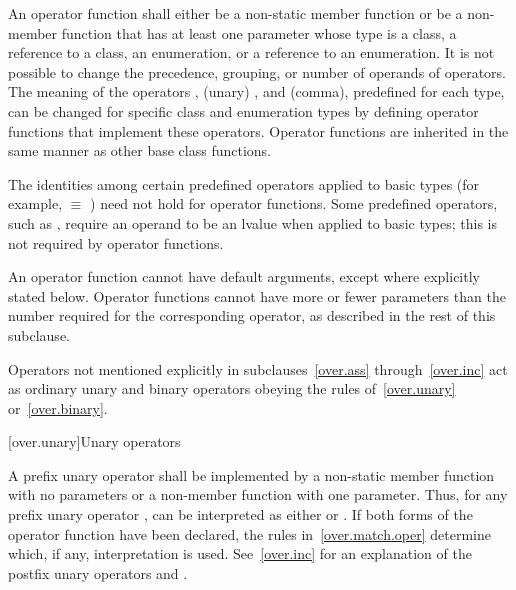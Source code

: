 \pnum
{}%
An operator function
shall either be a non-static member function or be a non-member function that
has at least one parameter whose type is a class, a reference to a class, an
enumeration, or a reference to an enumeration.
It is not possible to change the precedence, grouping, or number of operands
of operators.
The meaning of the operators
\tcode{=},
(unary)
\tcode{\&},
and
\tcode{,}
(comma), predefined for each type, can be changed for specific
class and enumeration types by
defining operator functions that implement these operators.
%
Operator functions are inherited in the same manner as other base class
functions.

\pnum
{}%
The identities among certain predefined operators applied to basic types
(for example,
 $\equiv$
)
need not hold for operator functions.
Some predefined operators, such as
\tcode{+=},
require an operand to be an lvalue when applied to basic types;
this is not required by operator functions.

\pnum
{}%
An operator function cannot have default arguments,
except where explicitly stated below.
Operator
functions cannot have more or fewer parameters than the
number required for the corresponding operator, as
described in the rest of this subclause.

\pnum
Operators not mentioned explicitly in subclauses~\ref{over.ass} through~\ref{over.inc}
act as ordinary unary and binary
operators obeying the rules of~\ref{over.unary} or~\ref{over.binary}.%
%

[over.unary]{Unary operators}%
%

\pnum
A prefix unary operator shall be implemented by a
non-static member function with no parameters or a
non-member function with one parameter.
%
Thus, for any prefix unary operator
,
can be interpreted as either
or
.
If both forms of the operator function have been declared,
the rules in~\ref{over.match.oper} determine which, if any, interpretation is
used.
See~\ref{over.inc} for an explanation of the postfix unary operators
\tcode{++}
and
\tcode{\dcr}.

